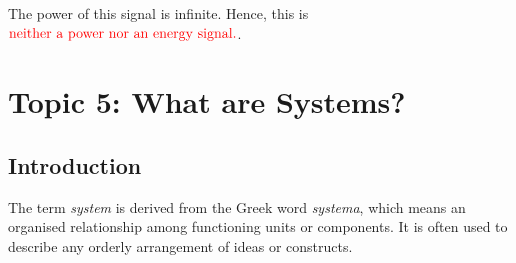 \documentclass[
  12pt,
  a4paper,
]{report}
\begin{document}
The power of this signal is infinite. Hence, this is
\(\textcolor{red}{\text{neither a power nor an energy signal.}}\).

\newpage{}

\section{Topic 5: What are Systems?}\label{topic-5-what-are-systems}

\subsection{Introduction}\label{introduction-1}

The term \emph{system} is derived from the Greek word \emph{systema},
which means an organised relationship among functioning units or
components. It is often used to describe any orderly arrangement of
ideas or constructs.
\end{document}

